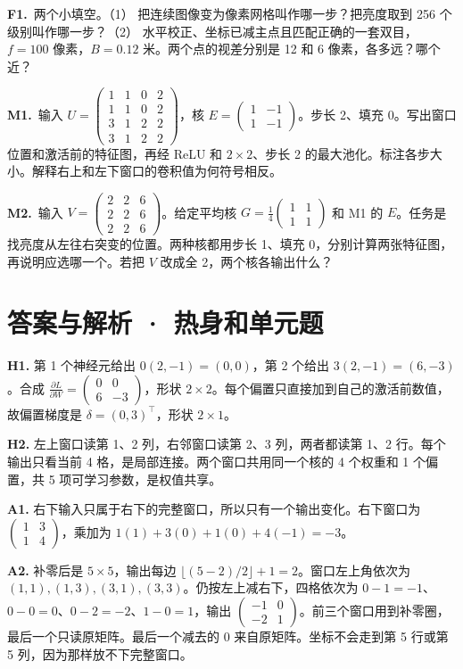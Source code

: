 \documentclass[UTF8,a4paper,11pt]{ctexart}
\newcommand{\CompactQuestion}[2]{\par\noindent\textbf{#1.}\ #2\par\vspace{.8em}}
\begin{document}
\CompactQuestion{F1}{两个小填空。（1） 把连续图像变为像素网格叫作哪一步？把亮度取到 256 个级别叫作哪一步？（2） 水平校正、坐标已减主点且匹配正确的一套双目，$f=100$ 像素，$B=0.12$ 米。两个点的视差分别是 12 和 6 像素，各多远？哪个近？}
\CompactQuestion{M1}{输入 $U=\begin{pmatrix}1&1&0&2\\1&1&0&2\\3&1&2&2\\3&1&2&2\end{pmatrix}$，核 $E=\begin{pmatrix}1&-1\\1&-1\end{pmatrix}$。步长 2、填充 0。写出窗口位置和激活前的特征图，再经 ReLU 和 $2\times2$、步长 2 的最大池化。标注各步大小。解释右上和左下窗口的卷积值为何符号相反。}
\CompactQuestion{M2}{输入 $V=\begin{pmatrix}2&2&6\\2&2&6\\2&2&6\end{pmatrix}$。给定平均核 $G=\frac14\begin{pmatrix}1&1\\1&1\end{pmatrix}$ 和 M1 的 $E$。任务是找亮度从左往右突变的位置。两种核都用步长 1、填充 0，分别计算两张特征图，再说明应选哪一个。若把 $V$ 改成全 2，两个核各输出什么？}
\clearpage
\section{答案与解析 · 热身和单元题}
\textbf{H1.} 第 1 个神经元给出 $0(2,-1)=(0,0)$，第 2 个给出 $3(2,-1)=(6,-3)$。合成 $\frac{\partial L}{\partial W}=\begin{pmatrix}0&0\\6&-3\end{pmatrix}$，形状 $2\times2$。每个偏置只直接加到自己的激活前数值，故偏置梯度是 $\delta=(0,3)^\top$，形状 $2\times1$。

\textbf{H2.} 左上窗口读第 1、2 列，右邻窗口读第 2、3 列，两者都读第 1、2 行。每个输出只看当前 4 格，是局部连接。两个窗口共用同一个核的 4 个权重和 1 个偏置，共 5 项可学习参数，是权值共享。

\textbf{A1.} 右下输入只属于右下的完整窗口，所以只有一个输出变化。右下窗口为 $\begin{pmatrix}1&3\\1&4\end{pmatrix}$，乘加为 $1(1)+3(0)+1(0)+4(-1)=-3$。

\textbf{A2.} 补零后是 $5\times5$，输出每边 $\lfloor(5-2)/2\rfloor+1=2$。窗口左上角依次为 $(1,1),(1,3),(3,1),(3,3)$。仍按左上减右下，四格依次为 $0-1=-1$、$0-0=0$、$0-2=-2$、$1-0=1$，输出 $\begin{pmatrix}-1&0\\-2&1\end{pmatrix}$。前三个窗口用到补零圈，最后一个只读原矩阵。最后一个减去的 0 来自原矩阵。坐标不会走到第 5 行或第 5 列，因为那样放不下完整窗口。
\end{document}
